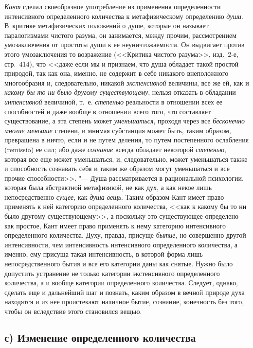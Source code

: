 {\em Кант} сделал своеобразное употребление из применения определенности
интенсивного определенного количества к метафизическому определению {\em души}.
В~критике метафизических положений о душе, которые он называет паралогизмами
чистого разума, он занимается, между прочим, рассмотрением умозаключения от
простоты души к ее неуничтожаемости. Он выдвигает против этого умозаключения то
возражение (<<Критика чистого разума>>, изд.~2-е, стр.~414), что <<даже если мы
и признаем, что душа обладает такой простой природой, так как она, именно, не
содержит в себе никакого внеположного многообразия и, следовательно, никакой
{\em экстенсивной} величины, все же ей, как и {\em какому бы то ни было другому
существующему}, нельзя отказать в обладании {\em интенсивной} величиной, т.~е.
{\em степенью} реальности в отношении всех ее способностей и даже вообще
в отношении всего того, что составляет существование, а эта степень может
{\em уменьшаться}, проходя через все {\em бесконечно многие меньшие} степени, и
мнимая субстанция может быть, таким образом, превращена в ничто, если и не
путем деления, то путем постепенного ослабления (remissio) ее сил; ибо даже
{\em сознание} всегда обладает некоторой {\em степенью}, которая все еще может
уменьшаться, и, следовательно, может уменьшаться также и способность сознавать
себя и таким же образом могут уменьшаться и все прочие способности>>. "--- Душа
рассматривается в рациональной психологии, которая была абстрактной
метафизикой, не как дух, а как некое лишь непосредственно {\em сущее}, как
{\em душа-вещь}. Таким образом Кант имеет право применять к ней категорию
определенного количества, <<как к какому бы то ни было другому существующему>>,
а поскольку это существующее определено как простое, Кант имеет право применять
к нему категорию интенсивного определенного количества. Духу, правда, присуще
{\em бытие}, но совершенно другой интенсивности, чем интенсивность интенсивного
определенного количества, а именно, ему присуща такая интенсивность, в которой
форма лишь непосредственного бытия и все его категории даны как снятые. Нужно
было допустить устранение не только категории экстенсивного определенного
количества, а и вообще категории определенного количества. Следует, однако,
сделать еще и дальнейший шаг и познать, каким образом в вечной природе духа
находятся и из нее проистекают наличное бытие, сознание, конечность без того,
чтобы он вследствие этого становился вещью.

\subsection[с) Изменение определенного количества]%
{с) Изменение определенного количества}


